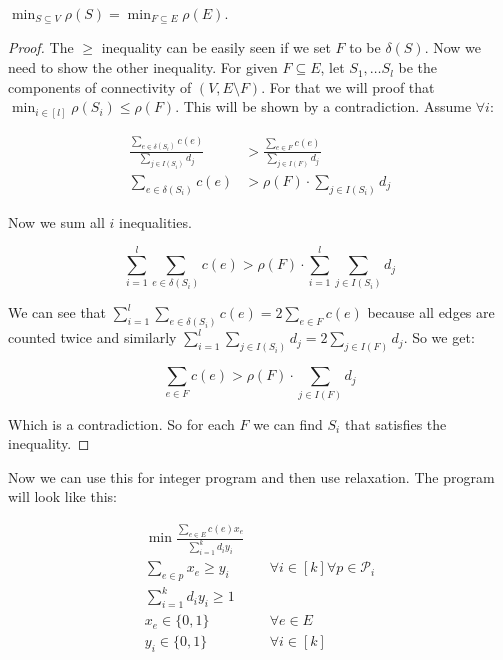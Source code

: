 \begin{lemma}
	$\min_{S \subseteq V} \rho(S) = \min_{F \subseteq E} \rho(E)$.
\end{lemma}

\begin{proof}
	The $\geq$ inequality can be easily seen if we set $F$ to be $\delta(S)$. Now we need to show the other inequality. For given $F \subseteq E$, let $S_{1}, \dots S_{l}$ be the components of connectivity of $(V, E \setminus F)$. For that we will proof that $\min_{i \in [l]} \rho(S_{i}) \leq \rho(F)$. This will be shown by a contradiction. Assume $\forall i$:
	
	$$
	\begin{aligned}
		\frac{\sum_{e \in \delta(S_{i})}c(e)}{\sum_{j \in I(S_{i})} d_{j}} &> \frac{\sum_{e \in F}c(e)}{\sum_{j \in I(F)} d_{j}}\\
		\sum_{e \in \delta(S_{i})}c(e) &> \rho(F) \cdot \sum_{j \in I(S_{i})} d_{j}
	\end{aligned}
	$$
	
	Now we sum all $i$ inequalities.
	
	$$
	\sum_{i = 1}^{l} \sum_{e \in \delta(S_{i})}c(e) > \rho(F) \cdot \sum_{i = 1}^{l} \sum_{j \in I(S_{i})} d_{j}
	$$

	We can see that $\sum_{i = 1}^{l} \sum_{e \in \delta(S_{i})}c(e) = 2 \sum_{e \in F} c(e)$ because all edges are counted twice and similarly $\sum_{i = 1}^{l} \sum_{j \in I(S_{i})} d_{j} = 2 \sum_{j \in I(F)} d_{j}$. So we get:
	
	$$
	\sum_{e \in F} c(e) > \rho(F) \cdot \sum_{j \in I(F)} d_{j}
	$$
	
	Which is a contradiction. So for each $F$ we can find $S_{i}$ that satisfies the inequality.
\end{proof}

Now we can use this for integer program and then use relaxation. The program will look like this:

$$
\begin{aligned}
	\min \frac{\sum_{e \in E} c(e) x_{e}}{\sum_{i = 1}^{k}d_{i}y_{i}} \\
	\sum_{e \in p} x_{e} \geq y_{i} & \quad \forall i \in [k] \forall p \in \mathcal{P}_{i}\\
	\sum_{i = 1}^{k} d_{i}y_{i} \geq 1 \\
	x_{e} \in \{0,1\} &\quad \forall e \in E\\
	y_{i} \in \{0,1\} &\quad \forall i \in [k]
\end{aligned}
$$

